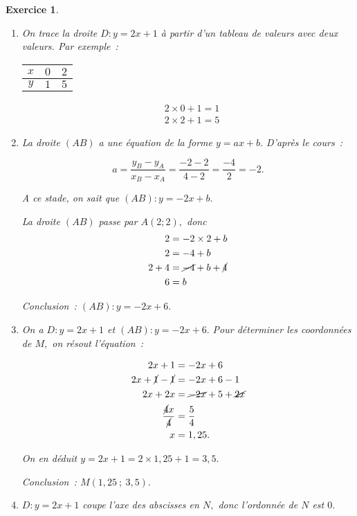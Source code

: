 \documentclass[10pt]{article}
\newtheorem{exo}{Exercice}
\begin{document}
\begin{exo}


\begin{enumerate}
\item On trace la droite $D:y=2x+1$ à partir d'un tableau de valeurs avec deux valeurs. Par exemple~:
\setlength{\columnseprule}{1pt}

\begin{multicols}{2}
\begin{center}
\begin{tabular}{|c|c|c|}\hline
$x$&$0$&$2$\\ \hline
$y$&$1$&$5$\\ \hline
\end{tabular}
\end{center}
\columnbreak
\begin{align*}
&2\times 0+1=1\\
&2\times 2+1=5\end{align*}
\end{multicols}
\item La droite $(AB)$ a une équation de la forme $y=ax+b.$ D'après le cours~:

\[a=\frac{y_B-y_A}{x_B-x_A}=\frac{-2-2}{4-2}=\frac{-4}{2}=-2.\]

A ce stade, on sait que $(AB):y=-2x+b.$

\medskip

La droite $(AB)$ passe par $A(2;2),$ donc
\begin{align*}2&=-2\times 2+b\\
2&=-4+b\\
2+4&=\cancel{-4}+b+\cancel{4}\\
6&=b
\end{align*}


Conclusion~: $(AB):y=-2x+6.$

\item On a $D:y=2x+1$ et $(AB):y=-2x+6.$ Pour déterminer les coordonnées de $M,$ on résout l'équation~:

\begin{align*}
2x+1&=-2x+6\\
2x+\cancel{1}-\cancel{1}&=-2x+6-1\\
2x+2x&=\cancel{-2x}+5+\cancel{2x}\\
\frac{\cancel{4}x}{\cancel{4}}&=\frac{5}{4}\\
x&=1,25.
\end{align*}

On en déduit $y=2x+1=2\times 1,25+1=3,5.$

Conclusion~: $M(1,25~;~3,5).$
\item $D:y=2x+1$ coupe l'axe des abscisses en $N,$ donc l'ordonnée de $N$ est $0.$


\end{enumerate}
\end{exo}
\end{document}
